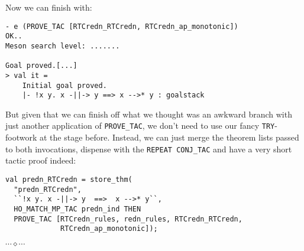\documentclass[12pt]{article}
\newcommand{\eos}{\hfill{}$\cdots\diamond\cdots$\hfill{}\vspace{5mm}}
\begin{document}
Now we can finish with:
\begin{session}\begin{verbatim}
- e (PROVE_TAC [RTCredn_RTCredn, RTCredn_ap_monotonic])
OK..
Meson search level: .......

Goal proved.[...]
> val it =
    Initial goal proved.
    |- !x y. x -||-> y ==> x -->* y : goalstack
\end{verbatim}\end{session}
But given that we can finish off what we thought was an awkward branch
with just another application of \texttt{PROVE\_TAC}, we don't need to
use our fancy \texttt{TRY}-footwork at the stage before.  Instead, we
can just merge the theorem lists passed to both invocations, dispense
with the \texttt{REPEAT CONJ\_TAC} and have a very short tactic proof
indeed:
\begin{session}\begin{verbatim}
val predn_RTCredn = store_thm(
  "predn_RTCredn",
  ``!x y. x -||-> y  ==>  x -->* y``,
  HO_MATCH_MP_TAC predn_ind THEN
  PROVE_TAC [RTCredn_rules, redn_rules, RTCredn_RTCredn,
             RTCredn_ap_monotonic]);
\end{verbatim}\end{session}
\eos{}
\end{document}
